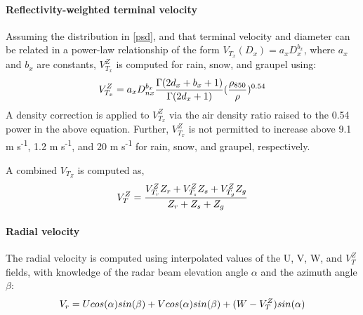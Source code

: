 \paragraph{Reflectivity-weighted terminal velocity}

Assuming the distribution in \ref{psd}, and that terminal velocity and diameter can be related in a power-law relationship of the form \(V_{T_x}(D_x) = a_xD_x^{b_x}\), where \(a_x\) and \(b_x\) are constants, \(V^Z_{T_x}\) is computed for rain, snow, and graupel using:
\begin{equation}
\centering
V^Z_{T_x} = a_xD_{nx}^{b_x}\frac{\Gamma(2d_x+b_x+1)}{\Gamma(2d_x+1)}(\frac{\rho_{850}}{\rho})^{0.54}
\end{equation}
A density correction is applied to \(V^Z_{T_x}\) via the air density ratio raised to the 0.54 power in the above equation. Further, \(V^Z_{T_x}\) is not permitted to increase above 9.1 m s\textsuperscript{-1}, 1.2 m s\textsuperscript{-1}, and 20 m s\textsuperscript{-1} for rain, snow, and graupel, respectively.

A combined \(V_{T_{Z}}\) is computed as,
\begin{equation}
\centering
V^Z_T = \frac{V^Z_{T_r}Z_r + V^Z_{T_s}Z_s + V^Z_{T_g}Z_g}{Z_r + Z_s + Z_g}
\end{equation}

 
\paragraph{Radial velocity}

The radial velocity is computed using interpolated values of the U, V, W, and \(V^Z_T\) fields, with knowledge of the radar beam elevation angle \(\alpha\) and the azimuth angle \(\beta\):
\begin{equation}
\centering
V_r = Ucos(\alpha)sin(\beta) + Vcos(\alpha)sin(\beta) + (W-V^Z_T)sin(\alpha)
\end{equation}

